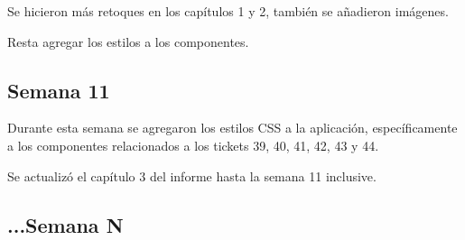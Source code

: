 Se hicieron más retoques en los capítulos 1 y 2, también se añadieron imágenes.

Resta agregar los estilos a los componentes.

\subsection{Semana 11}
Durante esta semana se agregaron los estilos CSS a la aplicación, específicamente a los componentes
relacionados a los tickets 39, 40, 41, 42, 43 y 44. 

Se actualizó el capítulo 3 del informe hasta la semana 11 inclusive.


\subsection{...Semana N}